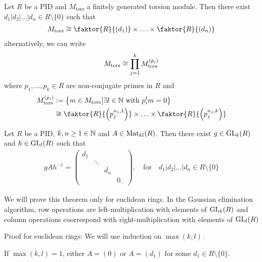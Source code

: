 \begin{ntheorem}
	Let $R$ be a PID and $M_{\text{tors}}$ a finitely generated torsion module. Then there exist $d_{1}|d_2|\ldots| d_{n} \in R \setminus \{0\}$ such that
	\begin{align*}
		M_{\text{tors}} \iso \faktor{R}{(d_1)} \times \ldots \times \faktor{R}{(d_n)}
	\end{align*}
	alternatively, we can write
	\begin{align*}
		M_{\text{tors}} \cong \prod_{j = 1}^{k} M_{\text{tors}}^{(p_i)}
	\end{align*}
	where $p_1, \ldots, p_k \in R$ are non-conjugate primes in $R$ and
	\begin{align*}
		M_{\text{tors}}^{(p_i)} &:= \left\{m \in M_{\text{tors}} \big\vert \exists l \in \N \text{ with }p_i^{l}m = 0\right\}\\
														&\iso \faktor{R}{\left(
															p_j^{n_j,1}
													\right)} \times \ldots \times \faktor{R}{\left(
														p_j^{n_j,k}
													\right)}
	\end{align*}
\end{ntheorem}

\begin{ntheorem}
	Let $R$ be a PID, $k,n \geq 1 \in \mathbb{N}$ and $A \in \operatorname{Mat}_{kl}(R)$. Then there exist $g \in \operatorname{GL}_k(R)$ and $h \in \operatorname{GL}_l(R)$ such that
	\begin{align*}
		gAh^{-1} = \begin{pmatrix}
		d_1 &  &  & \\
		 & \ddots &  & \\
		 &  & d_n & \\
		 &  &  & 0_{\ddots}
		\end{pmatrix}, \quad \text{for} \quad d_1|d_2|\ldots|d_n \in R \setminus \{0\}
	\end{align*}
\end{ntheorem}
We will prove this theorem only for euclidean rings.
In the Gaussian elimination algorithm, row operations are left-multiplication with elements of $\operatorname{GL}_k(R)$ and column operations coorrespond with right-multiplication with elements of $\operatorname{GL}_l(R)$

Proof for euclidean rings: We will use induction on $\max(k,l)$.

If $\max(k,l) = 1$, either $A = (0)$ or $A = (d_1)$ for some $d_1 \in R \setminus \{0\}$.

